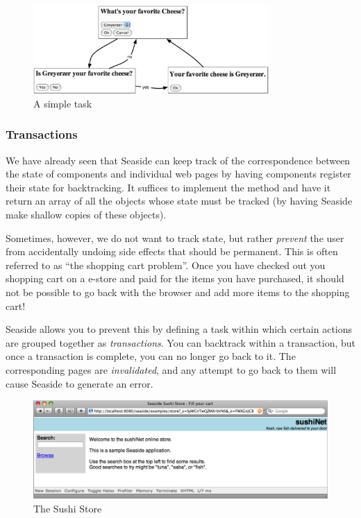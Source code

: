 \documentclass[a4paper,10pt,twoside]{book}
\begin{document}
\begin{figure}[ht]
\begin{center}
\includegraphics[width=0.8\textwidth]{chooseCheese}
\caption{A simple task}
\label{fig:chooseCheese}
\end{center}
\end{figure}

\subsubsection{Transactions}

We have already seen that Seaside can keep track of the correspondence between the state of components and individual web pages by having components register their state for backtracking.
It suffices to implement the method  and have it return an array of all the objects whose state must be tracked (\ie by having Seaside make shallow copies of these objects).

Sometimes, however, we do not want to track state, but rather \emph{prevent} the user from accidentally undoing side effects that should be permanent.
This is often referred to as ``the shopping cart problem''.
Once you have checked out you shopping cart on a e-store and paid for the items you have purchased, it should not be possible to go back with the browser and add more items to the shopping cart!

Seaside allows you to prevent this by defining a task within which certain actions are grouped together as \emph{transactions}.
You can backtrack within a transaction, but once a transaction is complete, you can no longer go back to it.
The corresponding pages are \emph{invalidated}, and any attempt to go back to them will cause Seaside to generate an error.

\begin{figure}[ht]
\begin{center}
\includegraphics[width=\textwidth]{sushiStore}
\caption{The Sushi Store}
\label{fig:sushiStore}
\end{center}
\end{figure}
\end{document}
